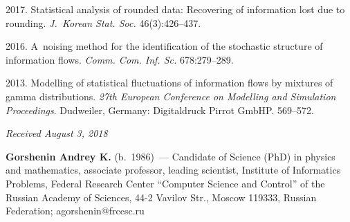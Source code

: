 \begin{multicols}{2}
{{\begin{thebibliography}{99}
 2017. 
Statistical analysis of rounded data: Recovering of information lost due to rounding. 
\textit{J.~Korean Stat. Soc.} 46(3):426--437.

 2016. 
A~noising method for the identification of the stochastic structure of information 
flows. \textit{Comm. Com. Inf. Sc.} 678:279--289.

 2013.  Modelling of statistical fluctuations of
information flows by mixtures of gamma distributions. 
\textit{27th European Conference on Modelling and Simulation Proceedings}. 
Dudweiler, Germany: Digitaldruck Pirrot GmbHP. 569--572.

\end{thebibliography}

 }
 }

\end{multicols}

\vspace*{-6pt}

\hfill{\small\textit{Received August 3, 2018}}



\Contrl

\noindent
\textbf{Gorshenin Andrey K.} (b.\ 1986)~--- Candidate of Science (PhD) in physics and
mathematics, associate professor, leading scientist, Institute of Informatics Problems,
Federal Research Center ``Computer Science and Control'' of the Russian Academy of
Sciences, 44-2 Vavilov Str., Moscow 119333, Russian Federation; 
\mbox{agorshenin@frccsc.ru}
\label{end\stat}

\renewcommand{\bibname}{\protect\rm Литература}      
